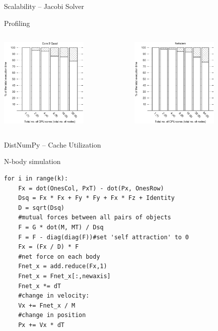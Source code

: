 \documentclass{beamer}
\begin{document}

\begin{frame}{Scalability -- Jacobi Solver}
\begin{center}
Profiling
\end{center}

\begin{columns}
  \begin{column}{0.5\textwidth}
  \begin{center}
    \hspace{21px}
    \includegraphics[width=160px]{../gfx/JacobiProfiling}
  \end{center}
  \end{column}
  \begin{column}{0.5\textwidth}
  \begin{center}
    \hspace{23px}
    \includegraphics[width=160px]{../gfx/JacobiProfiling2}
  \end{center}
  \end{column}
\end{columns}
\end{frame}


\begin{frame}[fragile]{DistNumPy -- Cache Utilization}
\begin{center}
N-body simulation
\end{center}
\begin{scriptsize}
\begin{verbatim}
for i in range(k):
    Fx = dot(OnesCol, PxT) - dot(Px, OnesRow)
    Dsq = Fx * Fx + Fy * Fy + Fx * Fz + Identity
    D = sqrt(Dsq)
    #mutual forces between all pairs of objects
    F = G * dot(M, MT) / Dsq
    F = F - diag(diag(F))#set 'self attraction' to 0
    Fx = (Fx / D) * F
    #net force on each body
    Fnet_x = add.reduce(Fx,1)
    Fnet_x = Fnet_x[:,newaxis]
    Fnet_x *= dT
    #change in velocity:
    Vx += Fnet_x / M
    #change in position
    Px += Vx * dT
\end{verbatim}
\end{scriptsize}
\end{frame}
\end{document}
